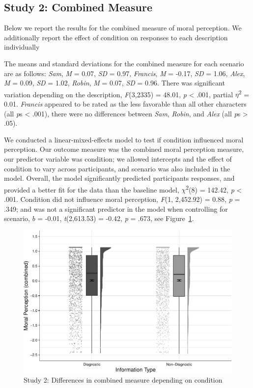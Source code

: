 \documentclass[
  man,floatsintext]{apa6}
\begin{document}
\subsection{Study 2: Combined Measure}\label{study-2-combined-measure}

Below we report the results for the combined measure of moral perception. We additionally report the effect of condition on responses to each description individually

The means and standard deviations for the combined measure for each scenario are as follows:
\emph{Sam},
\emph{M} = 0.07, \emph{SD} = 0.97,
\emph{Francis},
\emph{M} = -0.17, \emph{SD} = 1.06,
\emph{Alex},
\emph{M} = 0.09, \emph{SD} = 1.02,
\emph{Robin},
\emph{M} = 0.07, \emph{SD} = 0.96. There was significant variation depending on the description, \emph{F}(3,2335) = 48.01, \emph{p} \textless{} .001, partial \(\eta\)\textsuperscript{2} = 0.01. \emph{Francis} appeared to be rated as the less favorable than all other characters (all \emph{p}s \textless{} .001), there were no differences between \emph{Sam}, \emph{Robin}, and \emph{Alex} (all \emph{p}s \textgreater{} .05).

We conducted a linear-mixed-effects model to test if condition influenced moral perception. Our outcome measure was the combined moral perception measure, our predictor variable was condition; we allowed intercepts and the effect of condition to vary across participants, and scenario was also included in the model.
Overall, the model significantly predicted participants responses, and provided a better fit for the data than the baseline model, \(\chi\)\textsuperscript{2}(8) = 142.42, \emph{p} \textless{} .001. Condition did not influence moral perception, \emph{F}(1, 2,452.92) = 0.88, \emph{p} = .349; and was not a significant predictor in the model when controlling for scenario, \(b\) = -0.01, \emph{t}(2,613.53) = -0.42, \emph{p} = .673, see Figure~\ref{fig:S3combinedconditionplot}.

\begin{figure}[!h]
\includegraphics[width=\textwidth,]{Supplementary_files/figure-latex/S3combinedconditionplot-1} \caption{Study 2: Differences in combined measure depending on condition}\label{fig:S3combinedconditionplot}
\end{figure}
\end{document}
